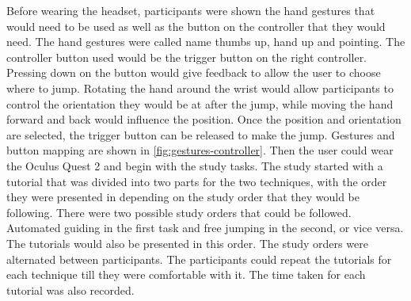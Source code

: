 Before wearing the headset, participants were shown the hand gestures that would need to be used as well as the button on the controller that they would need. The hand gestures were called name thumbs up, hand up and pointing. The controller button used would be the trigger button on the right controller. Pressing down on the button would give feedback to allow the user to choose where to jump. Rotating the hand around the wrist would allow participants to control the orientation they would be at after the jump, while moving the hand forward and back would influence the position. Once the position and orientation are selected, the trigger button can be released to make the jump. Gestures and button mapping are shown in \cref{fig:gestures-controller}. Then the user could wear the Oculus Quest 2 and begin with the study tasks. The study started with a tutorial that was divided into two parts for the two techniques, with the order they were presented in depending on the study order that they would be following. There were two possible study orders that could be followed. Automated guiding in the first task and free jumping in the second, or vice versa. The tutorials would also be presented in this order. The study orders were alternated between participants. The participants could repeat the tutorials for each technique till they were comfortable with it. The time taken for each tutorial was also recorded. 

